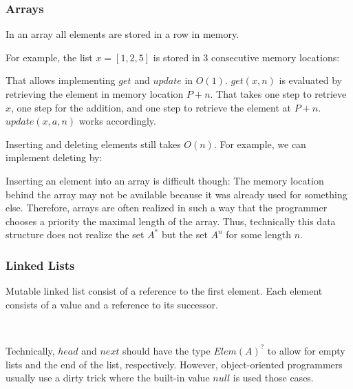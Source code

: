 \subsubsection{Arrays}

In an array all elements are stored in a row in memory.

For example, the list $x=[1,2,5]$ is stored in $3$ consecutive memory locations:
\begin{amemory}
\alocations
{}
\end{amemory}

That allows implementing $get$ and $update$ in $O(1)$.
$get(x,n)$ is evaluated by retrieving the element in memory location $P+n$.
That takes one step to retrieve $x$, one step for the addition, and one step to retrieve the element at $P+n$.
$update(x,a,n)$ works accordingly.

Inserting and deleting elements still takes $O(n)$.
For example, we can implement deleting by:
\begin{acode}
\end{acode}

Inserting an element into an array is difficult though: The memory location behind the array may not be available because it was already used for something else.
Therefore, arrays are often realized in such a way that the programmer chooses a priority the maximal length of the array.
Thus, technically this data structure does not realize the set $A^*$ but the set $A^n$ for some length $n$.

\subsubsection{Linked Lists}

Mutable linked list consist of a reference to the first element.
Each element consists of a value and a reference to its successor.
\begin{acode}
\\
\end{acode}

Technically, $head$ and $next$ should have the type $Elem(A)^?$ to allow for empty lists and the end of the list, respectively.
However, object-oriented programmers usually use a dirty trick where the built-in value $null$ is used those cases.

